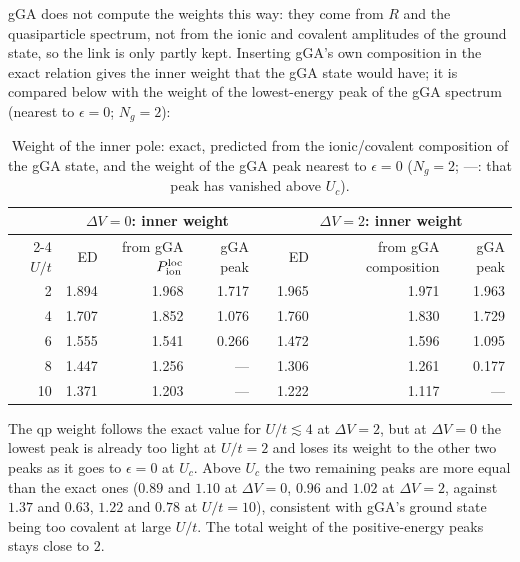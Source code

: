 \documentclass[11pt]{article}
\newcommand{\Ng}{N_{g}}
\newcommand{\dV}{\Delta V}
\begin{document}
gGA does not compute the weights this way: they come from $R$ and the quasiparticle spectrum, not from the ionic and covalent amplitudes of the ground state, so the link is only partly kept. Inserting gGA's own composition in the exact
relation gives the inner weight that the gGA state would have; it is compared below with the weight of the lowest-energy peak of the gGA spectrum (nearest to $\epsilon=0$; $\Ng=2$):
\begin{table}[H]
\centering\small
\begin{tabular}{r rrr c rrr}
\toprule
 & \multicolumn{3}{c}{$\dV=0$: inner weight} & & \multicolumn{3}{c}{$\dV=2$: inner weight}\\
\cmidrule{2-4}\cmidrule{6-8}
$U/t$ & ED & from gGA $P_{\rm ion}^{\rm loc}$ & gGA peak & & ED & from gGA composition & gGA peak\\
\midrule
2  & 1.894 & 1.968 & 1.717 & & 1.965 & 1.971 & 1.963\\
4  & 1.707 & 1.852 & 1.076 & & 1.760 & 1.830 & 1.729\\
6  & 1.555 & 1.541 & 0.266 & & 1.472 & 1.596 & 1.095\\
8  & 1.447 & 1.256 & ---   & & 1.306 & 1.261 & 0.177\\
10 & 1.371 & 1.203 & ---   & & 1.222 & 1.117 & ---\\
\bottomrule
\end{tabular}
\caption{Weight of the inner pole: exact, predicted from the ionic/covalent composition of the gGA state, and the weight of the gGA peak nearest to $\epsilon=0$ ($\Ng=2$; ---: that peak has vanished above $U_c$).}
\label{tab:innerweight}
\end{table}
The qp weight follows the exact value for $U/t\lesssim4$ at $\dV=2$, but at $\dV=0$ the lowest peak is already too light at $U/t=2$ and loses its weight to the other two peaks as it goes to $\epsilon=0$ at $U_c$.
Above $U_c$ the two remaining peaks are more equal than the exact ones ($0.89$ and $1.10$ at $\dV=0$, $0.96$ and $1.02$ at $\dV=2$, against $1.37$ and $0.63$, $1.22$ and $0.78$ at $U/t=10$), consistent with gGA's ground state being too covalent
at large $U/t$. The total weight of the positive-energy peaks stays close to $2$.
\end{document}
